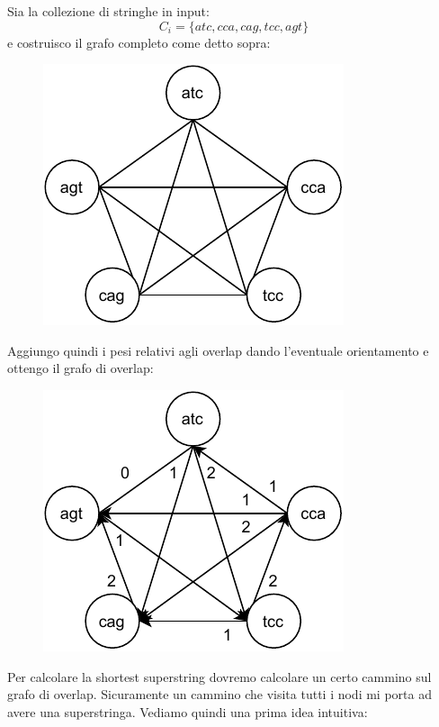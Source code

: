 \documentclass[a4paper,12pt, oneside]{book}
\begin{document}
\begin{esempio}
  Sia la collezione di stringhe in input:
  \[C_i=\{atc,cca,cag,tcc,agt\}\]
  e costruisco il grafo completo come detto sopra:
  \begin{figure}[H]
    \centering
    \includegraphics[scale = 0.9]{img/gra3.pdf}
  \end{figure}
  Aggiungo quindi i pesi relativi agli overlap dando l'eventuale orientamento e
  ottengo il grafo di overlap:
  \begin{figure}[H]
    \centering
    \includegraphics[scale = 0.9]{img/gra4.pdf}
  \end{figure}
\end{esempio}
Per calcolare la shortest superstring dovremo calcolare un certo cammino sul
grafo di overlap. Sicuramente un cammino che visita tutti i nodi mi porta ad
avere una superstringa. Vediamo quindi una prima idea intuitiva:
\end{document}
